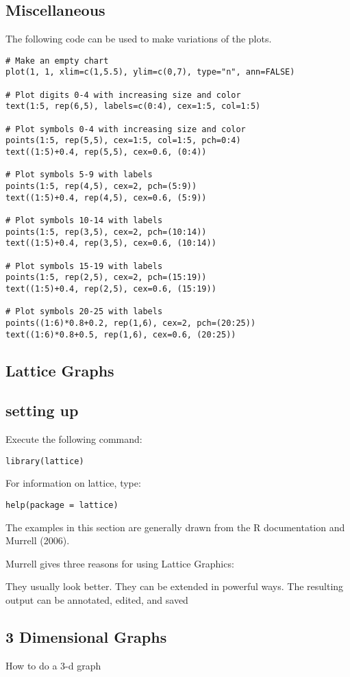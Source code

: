 \subsection{Miscellaneous}
The following code can be used to make variations of the plots.

\begin{myindentpar}{1cm}
\footnotesize \begin{verbatim}
# Make an empty chart
plot(1, 1, xlim=c(1,5.5), ylim=c(0,7), type="n", ann=FALSE)

# Plot digits 0-4 with increasing size and color
text(1:5, rep(6,5), labels=c(0:4), cex=1:5, col=1:5)

# Plot symbols 0-4 with increasing size and color
points(1:5, rep(5,5), cex=1:5, col=1:5, pch=0:4)
text((1:5)+0.4, rep(5,5), cex=0.6, (0:4))

# Plot symbols 5-9 with labels
points(1:5, rep(4,5), cex=2, pch=(5:9))
text((1:5)+0.4, rep(4,5), cex=0.6, (5:9))

# Plot symbols 10-14 with labels
points(1:5, rep(3,5), cex=2, pch=(10:14))
text((1:5)+0.4, rep(3,5), cex=0.6, (10:14))

# Plot symbols 15-19 with labels
points(1:5, rep(2,5), cex=2, pch=(15:19))
text((1:5)+0.4, rep(2,5), cex=0.6, (15:19))

# Plot symbols 20-25 with labels
points((1:6)*0.8+0.2, rep(1,6), cex=2, pch=(20:25))
text((1:6)*0.8+0.5, rep(1,6), cex=0.6, (20:25))
\end{verbatim}\normalsize
\end{myindentpar}




\subsection{Lattice Graphs}
\subsection{setting up}
Execute the following command:
\begin{myindentpar}{1cm}
\begin{verbatim}
library(lattice)
\end{verbatim}
\end{myindentpar}
For information on lattice, type:
\begin{myindentpar}{1cm}
\begin{verbatim}
help(package = lattice)
\end{verbatim}
\end{myindentpar}
The examples in this section are generally drawn from the R documentation and Murrell (2006).

Murrell gives three reasons for using Lattice Graphics:

They usually look better.
They can be extended in powerful ways.
The resulting output can be annotated, edited, and saved

\subsection{3 Dimensional Graphs}
How to do a 3-d graph

\newpage
